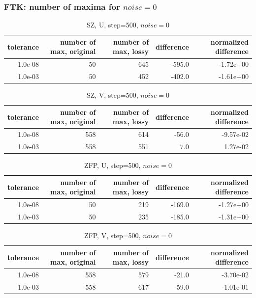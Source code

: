 \begin{frame}[fragile]
  \frametitle{FTK: number of maxima for $noise = 0$ }

  {\tiny
\begin{table}[H]
\centering
\begin{tabular}{|r|r|r|r|r|}
\hline
tolerance &  number of max, original &  number of max, lossy &  difference & normalized difference \\
\hline
  1.0e-08 &               50 &           645 &          -595.0 &      -1.72e+00 \\ \hline
  1.0e-03 &               50 &           452 &          -402.0 &      -1.61e+00 \\  \hline
\end{tabular}
\caption{SZ, U, step=500, $noise=0$}
\label{sz_u_n0}
\end{table}

\begin{table}[H]
\centering
\begin{tabular}{|r|r|r|r|r|}
\hline
tolerance &  number of max, original &  number of max, lossy &  difference & normalized difference \\
\hline
  1.0e-08 &              558 &           614 &           -56.0 &      -9.57e-02 \\ \hline
  1.0e-03 &              558 &           551 &             7.0 &       1.27e-02 \\ \hline
\end{tabular}
\caption{SZ, V, step=500, $noise=0$}
\label{sz_v_n0}
\end{table}

 \begin{table}[H]
\centering
\begin{tabular}{|r|r|r|r|r|}
\hline
tolerance &  number of max, original &  number of max, lossy &  difference & normalized difference \\
\hline 
  1.0e-08 &               50 &           219 &          -169.0 &      -1.27e+00 \\ \hline
  1.0e-03 &               50 &           235 &          -185.0 &      -1.31e+00 \\ \hline
\end{tabular}
\caption{ZFP, U, step=500, $noise=0$}
\label{zfp_u_n0}
\end{table}

\begin{table}[H]
\centering
\begin{tabular}{|r|r|r|r|r|}
\hline
tolerance &  number of max, original &  number of max, lossy &  difference & normalized difference \\
\hline 
  1.0e-08 &              558 &           579 &           -21.0 &      -3.70e-02 \\ \hline
  1.0e-03 &              558 &           617 &           -59.0 &      -1.01e-01 \\ \hline
\end{tabular}
\caption{ZFP, V, step=500, $noise=0$}
\label{zfp_v_n0}
\end{table}

}
\end{frame}

